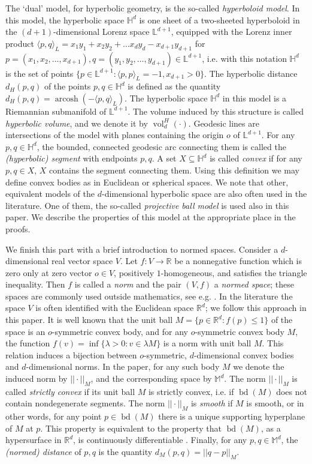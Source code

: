 \documentclass[twoside]{amsart}
\theoremstyle{plain}
\theoremstyle{definition}
\numberwithin{equation}{section}
\renewcommand{\Re}{\mathbb R}
\newcommand{\HHH}{\mathbb{H}}
\newcommand{\MM}{\mathbb{M}}
\DeclareMathOperator{\bd}{bd}
\DeclareMathOperator{\vol}{vol}
\DeclareMathOperator{\arcosh}{arcosh}
\begin{document}
The `dual' model, for hyperbolic geometry, is the so-called \emph{hyperboloid model}. In this model, the hyperbolic space $\HHH^d$ is one sheet of a two-sheeted hyperboloid in the $(d+1)$-dimensional Lorenz space $\mathbb{L}^{d+1}$, equipped with the Lorenz inner product $\langle p,q \rangle_L = x_1y_1+ x_2y_2+ \ldots x_dy_d-x_{d+1}y_{d+1}$ for $p=(x_1,x_2,\ldots,x_{d+1}), q=(y_1,y_2,\ldots,y_{d+1}) \in \mathbb{L}^{d+1}$, i.e. with this notation $\HHH^d$ is the set of points $\{ p \in \mathbb{L}^{d+1} : \langle p,p \rangle_L = -1, x_{d+1} > 0 \}$. The hyperbolic distance $d_H(p,q)$ of the points $p,q \in \HHH^d$ is defined as the quantity 
$d_H(p,q)= \arcosh (-\langle p,q \rangle_L)$. The hyperbolic space $\HHH^d$ in this model is a Riemannian submanifold of $\mathbb{L}^{d+1}$. The volume induced by this structure is called \emph{hyperbolic volume}, and we denote it by $\vol_d^H(\cdot)$. Geodesic lines are intersections of the model with planes containing the origin $o$ of $\mathbb{L}^{d+1}$. For any $p,q \in \HHH^d$, the bounded, connected geodesic arc connecting them is called the \emph{(hyperbolic) segment} with endpoints $p,q$. A set $X \subseteq \HHH^d$ is called \emph{convex} if for any $p,q \in X$, $X$ contains the segment connecting them. Using this definition we may define convex bodies as in Euclidean or spherical spaces. We note that other, equivalent models of the $d$-dimensional hyperbolic space are also often used in the literature. One of them, the so-called \emph{projective ball model} is used also in this paper. We describe the properties of this model at the appropriate place in the proofs.

We finish this part with a brief introduction to normed spaces. Consider a $d$-dimensional real vector space $V$. Let $f : V \to \Re$ be a nonnegative function which is
zero only at zero vector $o \in V$, positively $1$-homogeneous, and satisfies the triangle inequality. Then $f$ is called a \emph{norm} and the pair $(V,f)$ a \emph{normed space}; these spaces are commonly used outside mathematics, see e.g. \cite{Moretti}. In the literature the space $V$ is often identified with the Euclidean space $\Re^d$; we follow this approach in this paper. It is well known that the unit ball $M = \{ p \in \Re^d : f(p)\leq 1 \}$ of the space is an $o$-symmetric convex body, and for any $o$-symmetric convex body $M$, the function $f(v) = \inf \{ \lambda > 0 : v \in \lambda M \}$ is a norm with unit ball $M$. This relation induces a bijection between $o$-symmetric, $d$-dimensional convex bodies and $d$-dimensional norms. In the paper, for any such body $M$ we denote the induced norm by $|| \cdot ||_M$, and the corresponding space by $\MM^d$. 
The norm $||\cdot||_M$ is called \emph{strictly convex} if its unit ball $M$ is strictly convex, i.e. if $\bd(M)$ does not contain nondegenerate segments. The norm $||\cdot||_M$ is \emph{smooth} if $M$ is smooth, or in other words, for any point $p \in \bd(M)$ there is a unique supporting hyperplane of $M$ at $p$. This property is equivalent to the property that $\bd(M)$, as a hypersurface in $\Re^d$, is continuously differentiable \cite{Schneider}. Finally, for any $p,q \in \MM^d$, the \emph{(normed) distance} of $p,q$ is the quantity $d_M(p,q)=||q-p||_M$.
\end{document}
